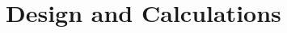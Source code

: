 \documentclass[a4paper,openany,fleqn,final]{memoir}
\begin{document}

\tableofcontents

\chapter{Design and Calculations}



\end{document}

